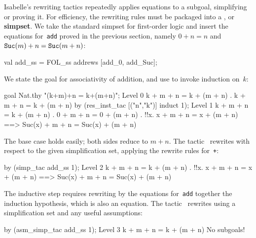 
Isabelle's rewriting tactics repeatedly applies equations to a subgoal,
simplifying or proving it.  For efficiency, the rewriting rules must be
packaged into a , or {\bf simpset}.  We take
the standard simpset for first-order logic and insert the equations
for~{\tt add} proved in the previous section, namely $0+n=n$ and ${\tt
  Suc}(m)+n={\tt Suc}(m+n)$:
\begin{ttbox}
val add_ss = FOL_ss addrews [add_0, add_Suc];
\end{ttbox}
We state the goal for associativity of addition, and
use  to invoke induction on~$k$:
\begin{ttbox}
goal Nat.thy "(k+m)+n = k+(m+n)";
{\out Level 0}
{\out k + m + n = k + (m + n)}
{. k + m + n = k + (m + n)}
\ttbreak
by (res_inst_tac [("n","k")] induct 1);
{\out Level 1}
{\out k + m + n = k + (m + n)}
{. 0 + m + n = 0 + (m + n)}
{. !!x. x + m + n = x + (m + n) ==>}
{\out          Suc(x) + m + n = Suc(x) + (m + n)}
\end{ttbox}
The base case holds easily; both sides reduce to $m+n$.  The
tactic~ rewrites with respect to the given simplification
set, applying the rewrite rules for~{\tt +}:
\begin{ttbox}
by (simp_tac add_ss 1);
{\out Level 2}
{\out k + m + n = k + (m + n)}
{. !!x. x + m + n = x + (m + n) ==>}
{\out          Suc(x) + m + n = Suc(x) + (m + n)}
\end{ttbox}
The inductive step requires rewriting by the equations for~{\tt add}
together the induction hypothesis, which is also an equation.  The
tactic~ rewrites using a simplification set and any
useful assumptions:
\begin{ttbox}
by (asm_simp_tac add_ss 1);
{\out Level 3}
{\out k + m + n = k + (m + n)}
{\out No subgoals!}
\end{ttbox}


